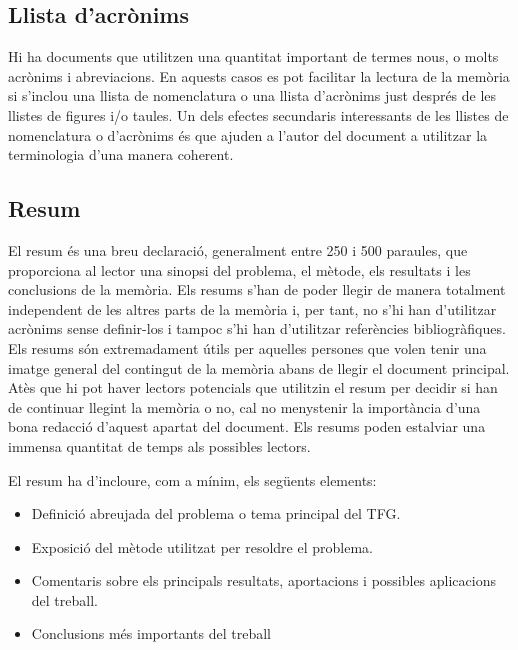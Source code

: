 \subsection{Llista d'acrònims}

Hi ha documents que utilitzen una quantitat important de termes nous, o molts acrònims i abreviacions. En aquests casos es pot facilitar la lectura de la memòria si s'inclou una llista de nomenclatura o una llista d'acrònims just després de les llistes de figures i/o taules. Un dels efectes secundaris interessants de les llistes de nomenclatura o d'acrònims és que ajuden a l'autor del document a utilitzar la terminologia d'una manera coherent.

\subsection{Resum}

El resum és una breu declaració, generalment entre 250 i 500 paraules, que proporciona al lector una sinopsi del problema, el mètode, els resultats i les conclusions de la memòria. Els resums s'han de poder llegir de manera totalment independent de les altres parts de la memòria i, per tant, no s'hi han d'utilitzar acrònims sense definir-los i tampoc s'hi han d'utilitzar referències bibliogràfiques. Els resums són extremadament útils per aquelles persones que volen tenir una imatge general del contingut de la memòria abans de llegir el document principal. Atès que hi pot haver lectors potencials que utilitzin el resum per decidir si han de continuar llegint la memòria o no, cal no menystenir la importància d'una bona redacció d'aquest apartat del document. Els resums poden estalviar una immensa quantitat de temps als possibles lectors.

El resum ha d'incloure, com a mínim, els següents elements:
\begin{itemize}\tightlist
   \item Definició abreujada del problema o tema principal del \ac{TFG}.

   \item Exposició del mètode utilitzat per resoldre el problema.

   \item Comentaris sobre els principals resultats, aportacions i possibles aplicacions del treball.

   \item Conclusions més importants del treball
\end{itemize}

